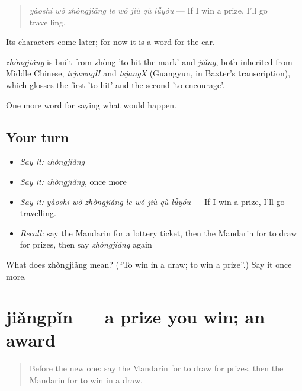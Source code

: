 \begin{quote}
\emph{yàoshi wǒ zhòngjiǎng le wǒ jiù qù lǚyóu} — If I win a prize, I'll go travelling.
\end{quote}

Its characters come later; for now it is a word for the ear.

\begin{cousinweb}
\emph{zhòngjiǎng} is built from  zhòng 'to hit the mark' and \emph{jiǎng}, both inherited from Middle Chinese, \emph{trjuwngH} and \emph{tsjangX} (Guangyun, in Baxter's transcription), which glosses the first 'to hit' and the second 'to encourage'.
\end{cousinweb}

\begin{grammarlens}[title={What you've built}]
One more word for saying what would happen.
\end{grammarlens}

\subsection*{Your turn}
\begin{itemize}
\raggedright
  \item \emph{Say it:} \emph{zhòngjiǎng}
  \item \emph{Say it:} \emph{zhòngjiǎng}, once more
  \item \emph{Say it:} \emph{yàoshi wǒ zhòngjiǎng le wǒ jiù qù lǚyóu} — If I win a prize, I'll go travelling.
  \item \emph{Recall:} say the Mandarin for a lottery ticket, then the Mandarin for to draw for prizes, then say \emph{zhòngjiǎng} again
\end{itemize}

\begin{tcolorbox}[breakable,colback=teal!4,colframe=teal!35!black,title={Before you move on}]
What does zhòngjiǎng mean? (\textquotedblleft{}To win in a draw; to win a prize\textquotedblright{}.) Say it once more.
\end{tcolorbox}
\section[jiǎngpǐn]{jiǎngpǐn — a prize you win; an award}

\label{lesson:ZH-C530-jiangpin}



\begin{quote}
Before the new one: say the Mandarin for to draw for prizes, then the Mandarin for to win in a draw.
\end{quote}


